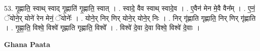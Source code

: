\documentclass[17pt]{extarticle}
\begin{document}
53. गृ॒ह्णाति॒ स्वाथ् स्वाद् गृ॒ह्णाति॑ गृ॒ह्णाति॒ स्वात् । . स्वादे॒ वैव स्वाथ् स्वादे॒व । . ए॒वैन॑ मेन मे॒वै वैन᳚म् । . ए॒नं॒ ॅयोने॒र् योने॑ रेन मेनं॒ ॅयोनेः᳚ । . योने॒र् निर् णिर् योने॒र् योने॒र् निः । . निर् गृ॑ह्णाति गृह्णाति॒ निर् णिर् गृ॑ह्णाति । . गृ॒ह्णा॒ति॒ विश्वे॒ विश्वे॑ गृह्णाति गृह्णाति॒ विश्वे᳚ । . विश्वे॑ दे॒वा दे॒वा विश्वे॒ विश्वे॑ दे॒वाः । \newline

\textbf{Ghana Paata } \newline
\end{document}

